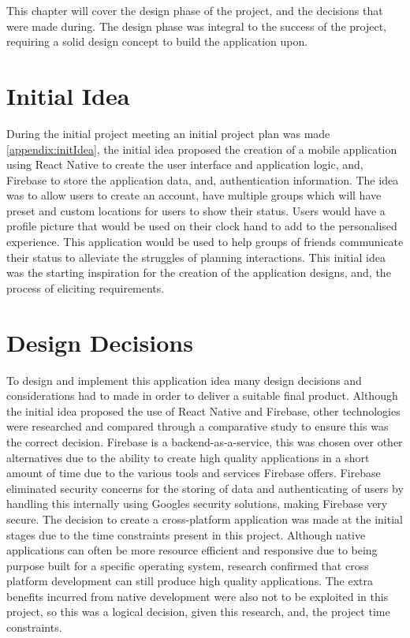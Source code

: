 This chapter will cover the design phase of the project, and the decisions  that were made during. The design phase was integral to the success of the project, requiring a solid design concept to build the application upon.

\section{Initial Idea}
During the initial project meeting an initial project plan was made \ref{appendix:initIdea}, the initial idea proposed the creation of a mobile application using React Native \cite{reactnative} to create the user interface and application logic, and, Firebase \cite{firebase} to store the application data, and, authentication information. The idea was to allow users to create an account, have multiple groups which will have preset and custom locations for users to show their status. Users would have a profile picture that would be used on their clock hand to add to the personalised experience. This application would be used to help groups of friends communicate their status to alleviate the struggles of planning interactions. This initial idea was the starting inspiration for the creation of the application designs, and, the process of eliciting requirements.

\section{Design Decisions}\label{designDecis}
To design and implement this application idea many design decisions and considerations had to made in order to deliver a suitable final product. Although the initial idea proposed the use of React Native and Firebase, other technologies were researched and compared through a comparative study \cite{compStudy} to ensure this was the correct decision. Firebase is a backend-as-a-service, this was chosen over other alternatives due to the ability to create high quality applications in a short amount of time due to the various tools and services Firebase offers. Firebase eliminated security concerns for the storing of data and authenticating of users by handling this internally using Googles security solutions, making Firebase very secure. The decision to create a cross-platform application was made at the initial stages due to the time constraints present in this project. Although native applications can often be more resource efficient and responsive due to being purpose built for a specific operating system, research confirmed that cross platform development can still produce high quality applications. The extra benefits incurred from native development were also not to be exploited in this project, so this was a logical decision, given this research, and, the project time constraints.

